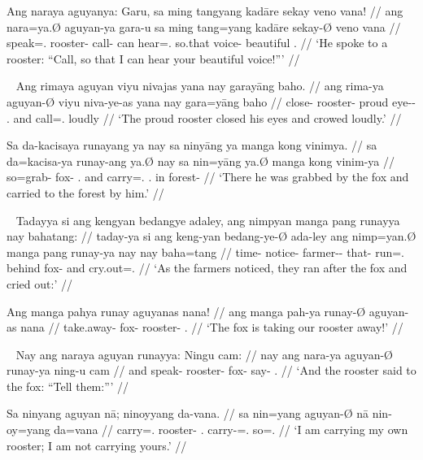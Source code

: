 \a\begingl
	\gla Ang naraya aguyanya: Garu, sa ming tangyang kadāre sekay veno vana! //
	\glb ang nara=ya.Ø aguyan-ya gara-u sa ming tang=yang kadāre sekay-Ø veno
		vana //
	\glc \AgtT{} speak=\TsgM{}.\Top{} rooster-\Loc{} call-\Imp{} \PatT{} can
		hear=\Fsg{}.\Aarg{} so.that voice-\Top{} beautiful \Second{}.\Gen{} //
	\glft `He spoke to a rooster: \enquote{Call, so that I can hear
		your beautiful voice!}' //
\endgl

\xe

\pex~ %
\a\begingl
	\gla Ang rimaya aguyan viyu nivajas yana nay garayāng baho. //
	\glb ang rima-ya aguyan-Ø viyu niva-ye-as yana nay gara=yāng baho //
	\glc \AgtT{} close-\TsgM{} rooster-\Top{} proud eye-\Pl{}-\Parg{}
		\TsgM{}.\Gen{} and call=\TsgM{}.\Aarg{} loudly //
	\glft `The proud rooster closed his eyes and crowed loudly.' //
\endgl

\a\begingl
	\gla Sa da-kacisaya runayang ya nay sa ninyāng ya manga kong vinimya. //
	\glb sa da=kacisa-ya runay-ang ya.Ø nay sa nin=yāng ya.Ø manga kong 
		vinim-ya //
	\glc \PatT{} so=grab-\TsgM{} fox-\Aarg{} \TsgM{}.\Top{} and \PatT{}
		carry=\TsgM{}.\Aarg{} \TsgM{}.\Top{} \Dir{} in forest-\Loc{} //
	\glft `There he was grabbed by the fox and carried to the forest by him.' //
\endgl

\xe

\pex~ %
\a\begingl
	\gla Tadayya si ang kengyan bedangye adaley, ang nimpyan manga pang runayya
		nay bahatang: //
	\glb taday-ya si ang keng-yan bedang-ye-Ø ada-ley ang nimp=yan.Ø manga pang
		runay-ya nay nay baha=tang //
	\glc time-\Loc{} \Rel{} \AgtT{} notice-\TplM{} farmer-\Pl{}-\Top{}
		that-\PargI{} \AgtT{} run=\TplM{}.\Top{} \Dir{} behind fox-\Loc{} and
		cry.out=\TplM{}.\Aarg{} //
	\glft `As the farmers noticed, they ran after the fox and cried out:' //
\endgl

\a\begingl
	\gla Ang manga pahya runay aguyanas nana! //
	\glb ang manga pah-ya runay-Ø aguyan-as nana //
	\glc \AgtT{} \Prog{} take.away-\TsgM{} fox-\Top{} rooster-\Parg{}
		\Fsg{}.\Gen{} //
	\glft `The fox is taking our rooster away!' //
\endgl

\xe

\pex~ %
\a\begingl
	\gla Nay ang naraya aguyan runayya: Ningu cam: //
	\glb nay ang nara-ya aguyan-Ø runay-ya ning-u cam //
	\glc and \AgtT{} speak-\TsgM{} rooster-\Top{} fox-\Loc{} say-\Imp{}
		\TplM{}.\Dat{} //
	\glft `And the rooster said to the fox: \enquote{Tell them:}' //
\endgl

\a\label{ex:negativbindung}\begingl
	\gla Sa ninyang aguyan nā; ninoyyang da-vana. //
	\glb sa nin=yang aguyan-Ø nā nin-oy=yang da=vana //
	\glc \PatT{} carry=\Fsg{}.\Aarg{} rooster-\Top{} \Fsg{}.\Gen{}
		carry-\Neg{}=\Fsg{}.\Aarg{} so=\Spl{}.\Gen{} //
	\glft `I am carrying my own rooster; I am not carrying yours.' //
\endgl

